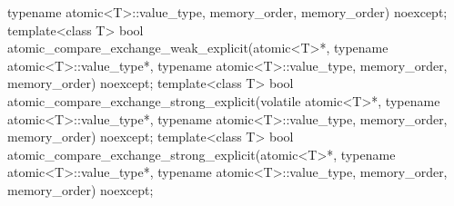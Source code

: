 \begin{codeblock}
{                                               typename atomic<T>::value_type,
                                               memory_order, memory_order) noexcept;
  template<class T>
    bool atomic_compare_exchange_weak_explicit(atomic<T>*,
                                               typename atomic<T>::value_type*,
                                               typename atomic<T>::value_type,
                                               memory_order, memory_order) noexcept;
  template<class T>
    bool atomic_compare_exchange_strong_explicit(volatile atomic<T>*,
                                                 typename atomic<T>::value_type*,
                                                 typename atomic<T>::value_type,
                                                 memory_order, memory_order) noexcept;
  template<class T>
    bool atomic_compare_exchange_strong_explicit(atomic<T>*,
                                                 typename atomic<T>::value_type*,
                                                 typename atomic<T>::value_type,
                                                 memory_order, memory_order) noexcept;

}
\end{codeblock}
